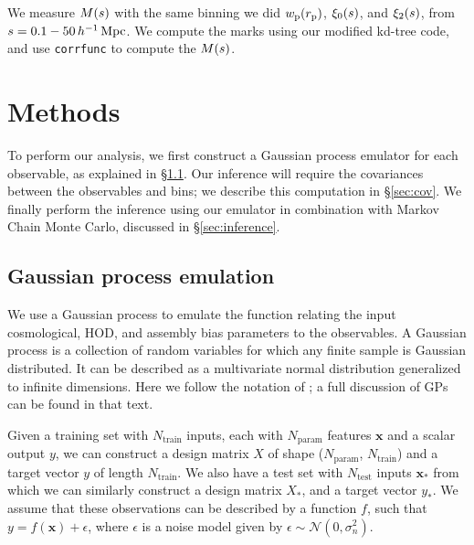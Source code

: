 We measure $M(s)$ with the same binning we did $w_\mathrm{p}(r_\mathrm{p})$, $\xi_0(s)$, and $\xi_2(s)$, from $s = 0.1-50 \, h^{-1}\,\mathrm{Mpc}$.
We compute the marks using our modified kd-tree code, and use \texttt{corrfunc} \citep{SinhaGarrison2019, Sinha2020} to compute the $M(s)$.


\section{Methods}
\label{sec:methods}

To perform our analysis, we first construct a Gaussian process emulator for each observable, as explained in \S\ref{sec:gp}.
Our inference will require the covariances between the observables and bins; we describe this computation in \S\ref{sec:cov}.
We finally perform the inference using our emulator in combination with Markov Chain Monte Carlo, discussed in \S\ref{sec:inference}.

\subsection{Gaussian process emulation}
\label{sec:gp}

We use a Gaussian process to emulate the function relating the input cosmological, HOD, and assembly bias parameters to the observables.
A Gaussian process is a collection of random variables for which any finite sample is Gaussian distributed.
It can be described as a multivariate normal distribution generalized to infinite dimensions.
Here we follow the notation of \cite{RasmussenWilliams2006}; a full discussion of GPs can be found in that text.

Given a training set with $N_\mathrm{train}$ inputs, each with $N_\mathrm{param}$ features $\bm{x}$ and a scalar output $y$, we can construct a design matrix $X$ of shape ($N_\mathrm{param}$, $N_\mathrm{train}$) and a target vector $y$ of length $N_\mathrm{train}$.
We also have a test set with $N_\mathrm{test}$ inputs $\bm{x}_*$ from which we can similarly construct a design matrix $X_*$, and a target vector $y_*$.
We assume that these observations can be described by a function $f$, such that $y = f(\bm{x}) + \epsilon$, where $\epsilon$ is a noise model given by $\epsilon \sim \mathcal{N}(0, \sigma_n^2)$.

